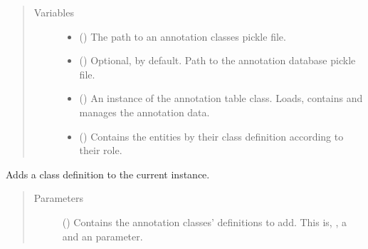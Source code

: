 \documentclass[letterpaper,10pt,english]{sphinxmanual}
\begin{document}
\begin{fulllineitems}
\begin{quote}
\begin{description}
\item[{Variables}] \leavevmode\begin{itemize}
\item {} 
 () \textendash{} The path to an annotation classes pickle file.

\item {} 
 () \textendash{} Optional,  by default. Path to the annotation database
pickle file.

\item {} 
 () \textendash{} An instance of the annotation table class. Loads, contains and
manages the annotation data.

\item {} 
 () \textendash{} Contains the entities by their class definition according to
their role.

\end{itemize}

\end{description}\end{quote}

\begin{fulllineitems}
\label{\detokenize{reference:pypath.annot.CustomAnnotation.add_class_definitions}}
Adds a class definition to the current instance.
\begin{quote}\begin{description}
\item[{Parameters}] \leavevmode
{} () \textendash{} Contains the annotation classes’ definitions to add. This
is, , a  and an  parameter.

\end{description}\end{quote}


\end{fulllineitems}
\end{fulllineitems}
\end{document}
